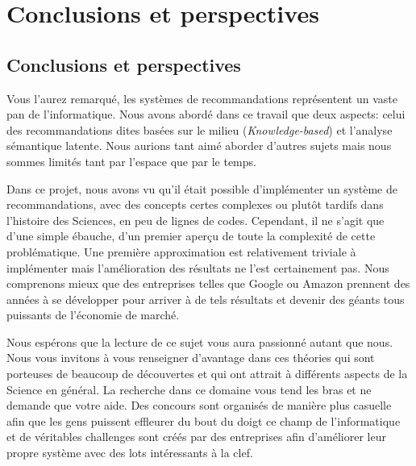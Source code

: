 \chapter{Conclusions et perspectives}

\section{Conclusions et perspectives}

Vous l'aurez remarqué, les systèmes de recommandations représentent un vaste pan de l'informatique. Nous avons abordé dans ce travail que deux aspects: celui des recommandations dites basées sur le milieu (\textit{Knowledge-based}) et l'analyse sémantique latente. Nous aurions tant aimé aborder d'autres sujets mais nous sommes limités tant par l'espace que par le temps.

Dans ce projet, nous avons vu qu'il était possible d'implémenter un système de recommandations, avec des concepts certes complexes ou plutôt tardifs dans l'histoire des Sciences, en peu de lignes de codes. Cependant, il ne s'agit que d'une simple ébauche, d'un premier aperçu de toute la complexité de cette problématique. Une première approximation est relativement triviale à implémenter mais l'amélioration des résultats ne l'est certainement pas. Nous comprenons mieux que des entreprises telles que Google ou Amazon prennent des années à se développer pour arriver à de tels résultats et devenir des géants tous puissants de l'économie de marché.

Nous espérons que la lecture de ce sujet vous aura passionné autant que nous. Nous vous invitons à vous renseigner d'avantage dans ces théories qui sont porteuses de beaucoup de découvertes et qui ont attrait à différents aspects de la Science en général. La recherche dans ce domaine vous tend les bras et ne demande que votre aide. Des concours sont organisés de manière plus casuelle afin que les gens puissent effleurer du bout du doigt ce champ de l'informatique et de véritables challenges sont créés par des entreprises afin d'améliorer leur propre système avec des lots intéressants à la clef.